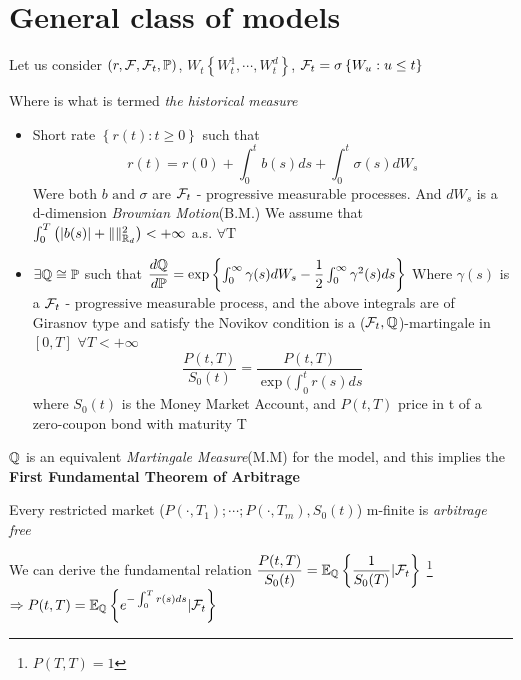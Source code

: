 \section{General class of models}
Let us consider $(r, \mathcal{F}, \mathcal{F}_{t}, \mathbb{P})$, 
$W_{t} \left\lbrace W_{t}^{1}, \cdots, W_{t}^{d} \right\rbrace$,
$\mathcal{F}_t = \sigma \left\lbrace W_u: u \leq t \right\rbrace$
\begin{rem}
 Where \Pbb is what is termed \textit{the historical measure}
\end{rem}
\begin{itemize}
 \item Short rate $\left\lbrace r(t): t \geq 0 \right\rbrace$ such that 
\begin{equation}
 r(t) = r(0) + \int_{0}^{t} b(s) ds + \int_0^t \sigma(s) dW_{s}
\end{equation}
Were both $b \text{ and } \sigma$ are $\mathcal{F}_t$ - progressive measurable processes. 
And $dW_s$ is a d-dimension \textit{Brownian Motion}(B.M.)
We assume that $\int_0^T \left( |b(s)| + \|\|^2_{\mathbb{R}_{d}}\right) < + \infty$ a.s. $\forall \text{T}$
\item $\exists \mathbb{Q} \cong \mathbb{P}$ such that $\dfrac{d \mathbb{Q}}{d \mathbb{P}} = \exp \left\lbrace\int_0^\infty \gamma(s) dW_s
- \dfrac{1}{2} \int_0^\infty \gamma^{2}(s) ds \right\rbrace$ 
\newline Where $\gamma(s)$ is a $\mathcal{F}_t$ - progressive measurable process, and the above integrals are
of Girasnov type and satisfy the Novikov condition is a ($\mathcal{F}_t, \mathbb{Q}$)-martingale in $[0,T]$ $\forall T 
\lt +\infty$
\begin{equation}
 \dfrac{P(t,T)}{S_{0}(t)} = \dfrac{P(t,T)}{\exp(\int_0^t r(s) ds}
\end{equation}
where $S_0(t)$ is the Money Market Account, and $P(t,T)$ price in t of a zero-coupon bond with maturity T
\end{itemize}
$\mathbb{Q}$ is an equivalent \textit{Martingale Measure}(M.M) for the model, and this implies the \textbf{First
 Fundamental
Theorem of Arbitrage} 
\begin{thm}
 Every restricted market ($P(\cdot, T_1); \cdots ; P(\cdot, T_m), S_{0}(t)$) m-finite is \textit{arbitrage free}
\end{thm}
We can derive the fundamental relation 
$\dfrac{P(t,T)}{S_0(t)} = \mathbb{E}_{\mathbb{Q}} \left\lbrace \dfrac{1}{S_{0}(T)} | \mathcal{F}_{t}\right\rbrace$
\footnote{$P(T,T) = 1$}
$\Rightarrow P(t,T) = \mathbb{E}_{\mathbb{Q}} \left\lbrace e^{-\int_{0}^{T} r(s) ds} | \mathcal{F}_t\right\rbrace$
